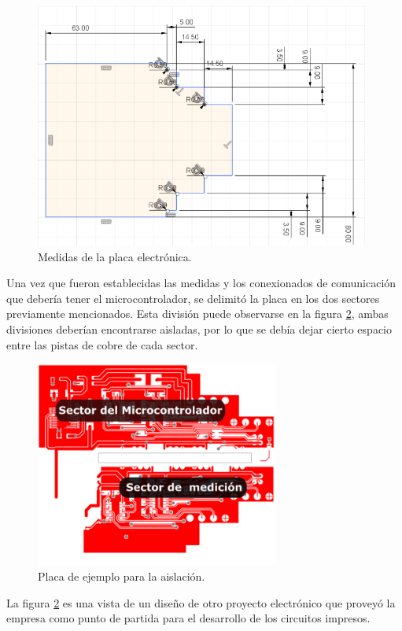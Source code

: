 \begin{figure}[!htb]
	\centering
	\includegraphics[width=110mm,keepaspectratio]{Figures/Placa1v6.png}
	\caption{Medidas de la placa electrónica.}
	\label{fig:medidaspcb}
\end{figure}

Una vez que fueron establecidas las medidas y los conexionados de comunicación que debería tener el microcontrolador, se delimitó la placa en los dos sectores previamente mencionados. Esta división puede observarse en la figura \ref{fig:pcbbase}, ambas divisiones deberían encontrarse aisladas, por lo que se debía dejar cierto espacio entre las pistas de cobre de cada sector.

\begin{figure}[!htb]
	\centering
	\includegraphics[width=80mm,keepaspectratio]{Figures/esquema22.png}
	\caption{Placa de ejemplo para la aislación.}
	\label{fig:pcbbase}
\end{figure}



La figura \ref{fig:pcbbase} es una vista de un diseño de otro proyecto electrónico que proveyó la empresa como punto de partida para el desarrollo de los circuitos impresos.

